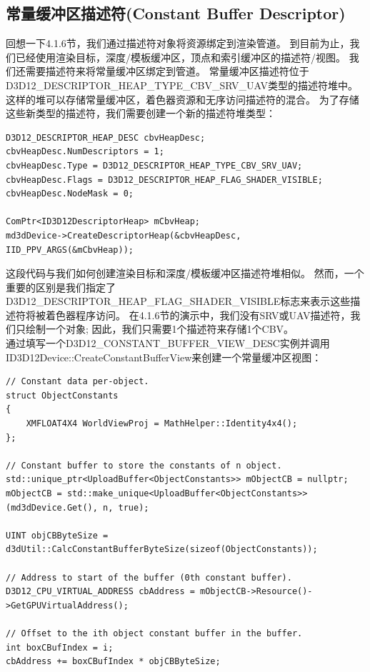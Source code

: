 \documentclass[11pt,a4paper,oldfontcommands]{memoir}
\begin{document}
{\subsection{常量缓冲区描述符(Constant Buffer Descriptor)}
\begin{flushleft}
回想一下4.1.6节，我们通过描述符对象将资源绑定到渲染管道。 到目前为止，我们已经使用渲染目标，深度/模板缓冲区，顶点和索引缓冲区的描述符/视图。 我们还需要描述符来将常量缓冲区绑定到管道。 常量缓冲区描述符位于D3D12\_DESCRIPTOR\_HEAP\_TYPE\_CBV\_SRV\_UAV类型的描述符堆中。 这样的堆可以存储常量缓冲区，着色器资源和无序访问描述符的混合。 为了存储这些新类型的描述符，我们需要创建一个新的描述符堆类型：\\
\begin{lstlisting}
D3D12_DESCRIPTOR_HEAP_DESC cbvHeapDesc;
cbvHeapDesc.NumDescriptors = 1;
cbvHeapDesc.Type = D3D12_DESCRIPTOR_HEAP_TYPE_CBV_SRV_UAV;
cbvHeapDesc.Flags = D3D12_DESCRIPTOR_HEAP_FLAG_SHADER_VISIBLE;
cbvHeapDesc.NodeMask = 0;

ComPtr<ID3D12DescriptorHeap> mCbvHeap;
md3dDevice->CreateDescriptorHeap(&cbvHeapDesc, IID_PPV_ARGS(&mCbvHeap));
\end{lstlisting}
这段代码与我们如何创建渲染目标和深度/模板缓冲区描述符堆相似。 然而，一个重要的区别是我们指定了D3D12\_DESCRIPTOR\_HEAP\_FLAG\_SHADER\_VISIBLE标志来表示这些描述符将被着色器程序访问。 在4.1.6节的演示中，我们没有SRV或UAV描述符，我们只绘制一个对象; 因此，我们只需要1个描述符来存储1个CBV。\\
通过填写一个D3D12\_CONSTANT\_BUFFER\_VIEW\_DESC实例并调用ID3D12Device::CreateConstantBufferView来创建一个常量缓冲区视图：\\
\begin{lstlisting}
// Constant data per-object.
struct ObjectConstants
{
    XMFLOAT4X4 WorldViewProj = MathHelper::Identity4x4();
};

// Constant buffer to store the constants of n object.
std::unique_ptr<UploadBuffer<ObjectConstants>> mObjectCB = nullptr;
mObjectCB = std::make_unique<UploadBuffer<ObjectConstants>>(md3dDevice.Get(), n, true);

UINT objCBByteSize = d3dUtil::CalcConstantBufferByteSize(sizeof(ObjectConstants));

// Address to start of the buffer (0th constant buffer).
D3D12_CPU_VIRTUAL_ADDRESS cbAddress = mObjectCB->Resource()->GetGPUVirtualAddress();

// Offset to the ith object constant buffer in the buffer.
int boxCBufIndex = i;
cbAddress += boxCBufIndex * objCBByteSize;


\end{lstlisting}
\end{flushleft}}
\end{document}
